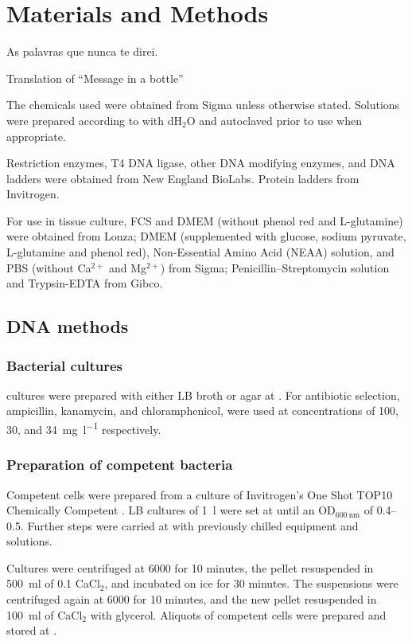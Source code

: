 \chapter{Materials and Methods}
\label{ch:methods}

\epigraph{As palavras que nunca te direi.}{Translation of ``Message in a bottle''}

\noindent
The chemicals used were obtained from Sigma unless otherwise stated. Solutions were prepared
according to  with dH$_2$O and autoclaved prior to use when appropriate.

Restriction enzymes, T4 DNA ligase, other DNA modifying enzymes, and DNA ladders were obtained
from New England BioLabs. Protein ladders from Invitrogen.

For use in tissue culture, FCS and DMEM (without phenol red and L-glutamine) were obtained from Lonza;
DMEM (supplemented with glucose, sodium pyruvate, L-glutamine and phenol red), Non-Essential Amino Acid
(NEAA) solution, and PBS (without Ca$^{2+}$ and Mg$^{2+}$) from Sigma; Penicillin--Streptomycin solution
and Trypsin-EDTA from Gibco.

\section{DNA methods}
  \subsection{Bacterial cultures}
     cultures were prepared with either LB broth or agar at . For antibiotic
    selection, ampicillin, kanamycin, and chloramphenicol, were used at concentrations of 100, 30,
    and \SI{34}{\mg\per\l} respectively.

  \subsection{Preparation of competent bacteria}
    Competent  cells were prepared from a culture of Invitrogen's One Shot
    TOP10 Chemically Competent . LB cultures of \SI{1}{\l} were set at
     until an OD$_{\SI{600}{\nm}}$ of \numrange{0.4}{0.5}. Further steps were carried
    at  with previously chilled equipment and solutions.
    
    Cultures were centrifuged at \SI{6000}{\gn} for 10 minutes, the pellet resuspended in
    \SI{500}{\ml} of \SI{0.1}{\mM} CaCl$_2$, and incubated on ice for 30 minutes. The suspensions
    were centrifuged again at \SI{6000}{\gn} for 10 minutes, and the new pellet resuspended in
    \SI{100}{\ml} of CaCl$_2$ with  glycerol. Aliquots of competent cells were prepared
    and stored at .
    
